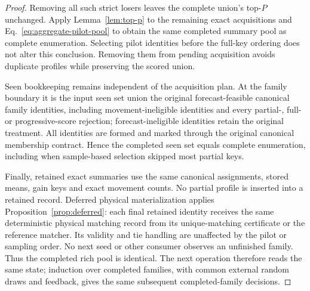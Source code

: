 \documentclass[11pt]{article}
\begin{document}
\begin{proof}
Removing all such strict losers leaves the complete union's top-$P$ unchanged. Apply Lemma~\ref{lem:top-p} to the remaining exact acquisitions and Eq.~\eqref{eq:aggregate-pilot-pool} to obtain the same completed summary pool as complete enumeration. Selecting pilot identities before the full-key ordering does not alter this conclusion. Removing them from pending acquisition avoids duplicate profiles while preserving the scored union.

Seen bookkeeping remains independent of the acquisition plan. At the family boundary it is the input seen set union the original forecast-feasible canonical family identities, including movement-ineligible identities and every partial-, full- or progressive-score rejection; forecast-ineligible identities retain the original treatment. All identities are formed and marked through the original canonical membership contract. Hence the completed seen set equals complete enumeration, including when sample-based selection skipped most partial keys.

Finally, retained exact summaries use the same canonical assignments, stored means, gain keys and exact movement counts. No partial profile is inserted into a retained record. Deferred physical materialization applies Proposition~\ref{prop:deferred}: each final retained identity receives the same deterministic physical matching record from its unique-matching certificate or the reference matcher. Its validity and tie handling are unaffected by the pilot or sampling order. No next seed or other consumer observes an unfinished family. Thus the completed rich pool is identical. The next operation therefore reads the same state; induction over completed families, with common external random draws and feedback, gives the same subsequent completed-family decisions.
\end{proof}
\end{document}
